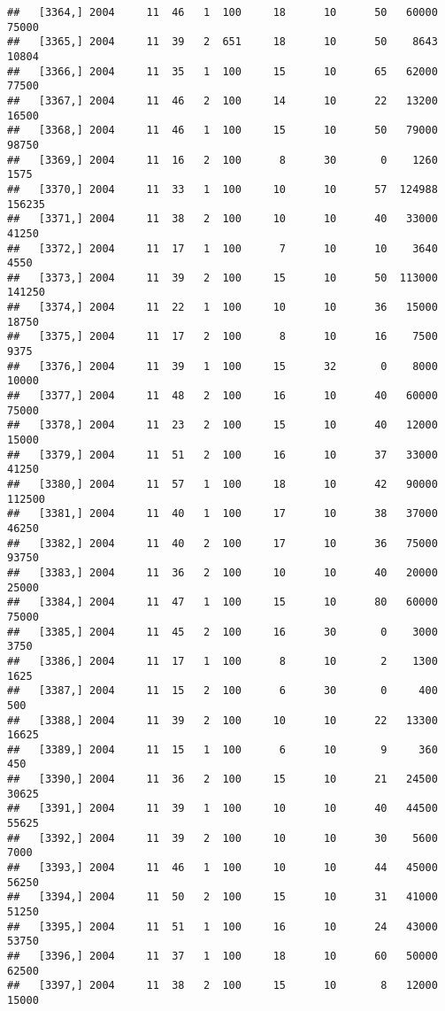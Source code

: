 \documentclass{article}\usepackage[]{graphicx}\usepackage[]{color}
\makeatletter
\newenvironment{kframe}{%
 \def\at@end@of@kframe{}%
 \ifinner\ifhmode%
  \def\at@end@of@kframe{\end{minipage}}%
  \begin{minipage}{\columnwidth}%
 \fi\fi%
 \def\FrameCommand##1{\hskip\@totalleftmargin \hskip-\fboxsep
 \colorbox{shadecolor}{##1}\hskip-\fboxsep
     \hskip-\linewidth \hskip-\@totalleftmargin \hskip\columnwidth}%
 \MakeFramed {\advance\hsize-\width
   \@totalleftmargin\z@ \linewidth\hsize
   \@setminipage}}%
 {\par\unskip\endMakeFramed%
 \at@end@of@kframe}
\newenvironment{knitrout}{}{} %
\makeatother
\begin{document}
\begin{knitrout}
\begin{kframe}
\begin{verbatim}
##   [3364,] 2004     11  46   1  100     18      10      50   60000   75000
##   [3365,] 2004     11  39   2  651     18      10      50    8643   10804
##   [3366,] 2004     11  35   1  100     15      10      65   62000   77500
##   [3367,] 2004     11  46   2  100     14      10      22   13200   16500
##   [3368,] 2004     11  46   1  100     15      10      50   79000   98750
##   [3369,] 2004     11  16   2  100      8      30       0    1260    1575
##   [3370,] 2004     11  33   1  100     10      10      57  124988  156235
##   [3371,] 2004     11  38   2  100     10      10      40   33000   41250
##   [3372,] 2004     11  17   1  100      7      10      10    3640    4550
##   [3373,] 2004     11  39   2  100     15      10      50  113000  141250
##   [3374,] 2004     11  22   1  100     10      10      36   15000   18750
##   [3375,] 2004     11  17   2  100      8      10      16    7500    9375
##   [3376,] 2004     11  39   1  100     15      32       0    8000   10000
##   [3377,] 2004     11  48   2  100     16      10      40   60000   75000
##   [3378,] 2004     11  23   2  100     15      10      40   12000   15000
##   [3379,] 2004     11  51   2  100     16      10      37   33000   41250
##   [3380,] 2004     11  57   1  100     18      10      42   90000  112500
##   [3381,] 2004     11  40   1  100     17      10      38   37000   46250
##   [3382,] 2004     11  40   2  100     17      10      36   75000   93750
##   [3383,] 2004     11  36   2  100     10      10      40   20000   25000
##   [3384,] 2004     11  47   1  100     15      10      80   60000   75000
##   [3385,] 2004     11  45   2  100     16      30       0    3000    3750
##   [3386,] 2004     11  17   1  100      8      10       2    1300    1625
##   [3387,] 2004     11  15   2  100      6      30       0     400     500
##   [3388,] 2004     11  39   2  100     10      10      22   13300   16625
##   [3389,] 2004     11  15   1  100      6      10       9     360     450
##   [3390,] 2004     11  36   2  100     15      10      21   24500   30625
##   [3391,] 2004     11  39   1  100     10      10      40   44500   55625
##   [3392,] 2004     11  39   2  100     10      10      30    5600    7000
##   [3393,] 2004     11  46   1  100     10      10      44   45000   56250
##   [3394,] 2004     11  50   2  100     15      10      31   41000   51250
##   [3395,] 2004     11  51   1  100     16      10      24   43000   53750
##   [3396,] 2004     11  37   1  100     18      10      60   50000   62500
##   [3397,] 2004     11  38   2  100     15      10       8   12000   15000

\end{verbatim}
\end{kframe}
\end{knitrout}
\end{document}

